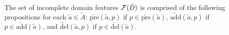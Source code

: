 \documentclass{article}
\newtheorem{definition}[theorem]{Definition}
\newenvironment{packed_itemize}{
\begin{itemize}
  \setlength{\itemsep}{1pt}
  \setlength{\parskip}{0pt}
  \setlength{\parsep}{0pt}
}{\end{itemize}}
\begin{document}
%
The set of incomplete domain features ${\cal F}(\tilde{D})$ is comprised of the following propositions for each $\tilde{a} \in \tilde{A}$:
 $\widetilde{\text{pre}}(\tilde{a}, p)$ if $p \in \widetilde{\text{pre}}(\tilde{a})$, $\widetilde{\text{add}}(\tilde{a}, p)$ if $p \in \widetilde{\text{add}}(\tilde{a})$, and $\widetilde{\text{del}}(\tilde{a}, p)$ if $p \in \widetilde{\text{del}}(\tilde{a})$.
%
\end{document}
